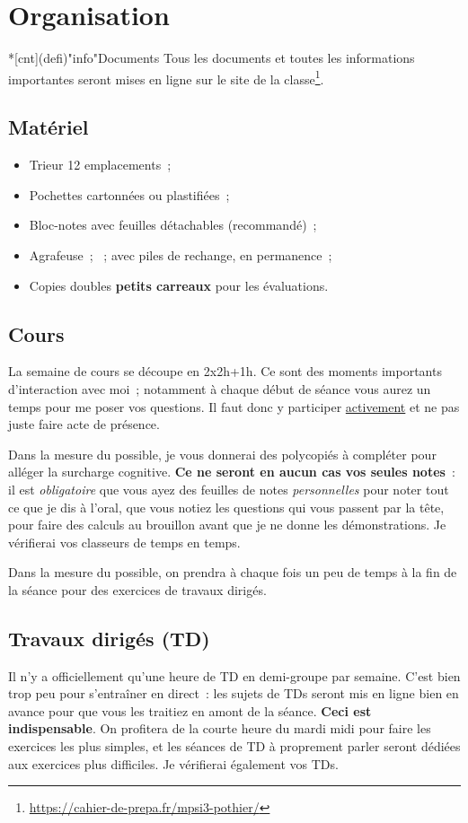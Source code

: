 \documentclass[10pt, garamond]{book}
\begin{document}
\section{Organisation}
\begin{tcb}*[cnt](defi)"info"{Documents}
	Tous les documents et toutes les informations importantes seront mises en
	ligne sur le site de la
	classe\footnote{\url{https://cahier-de-prepa.fr/mpsi3-pothier/}}.
\end{tcb}

\subsection{Matériel}
\begin{itemize}[label=$\diamond$, leftmargin=10pt]
	\item Trieur 12 emplacements~;
	\item Pochettes cartonnées ou plastifiées~;
	\item Bloc-notes avec feuilles détachables (recommandé)~;
	\item Agrafeuse~;
	      ~;
	       avec piles de rechange, en permanence~;
	\item Copies doubles \textbf{petits carreaux} pour les évaluations.
\end{itemize}

\subsection{Cours}
La semaine de cours se découpe en 2x2h+1h. Ce sont des moments importants
d'interaction avec moi~; notamment à chaque début de séance vous aurez un temps
pour me poser vos questions. Il faut donc y participer \ul{activement} et ne pas
juste faire acte de présence.

Dans la mesure du possible, je vous donnerai des polycopiés à compléter pour
alléger la surcharge cognitive. \textbf{Ce ne seront en aucun cas vos seules
	notes}~: il est \textit{obligatoire} que vous ayez des feuilles de notes
\textit{personnelles} pour noter tout ce que je dis à l'oral, que vous notiez
les questions qui vous passent par la tête, pour faire des calculs au brouillon
avant que je ne donne les démonstrations. Je vérifierai vos classeurs de temps
en temps.

Dans la mesure du possible, on prendra à chaque fois un peu de temps à la fin de
la séance pour des exercices de travaux dirigés.

\subsection{Travaux dirigés (TD)}
Il n'y a officiellement qu'une heure de TD en demi-groupe par semaine. C'est
bien trop peu pour s'entraîner en direct~: les sujets de TDs seront mis en ligne
bien en avance pour que vous les traitiez en amont de la séance. \textbf{Ceci
	est indispensable}. On profitera de la courte heure du mardi midi pour faire les
exercices les plus simples, et les séances de TD à proprement parler seront
dédiées aux exercices plus difficiles. Je vérifierai également vos TDs.
\end{document}
